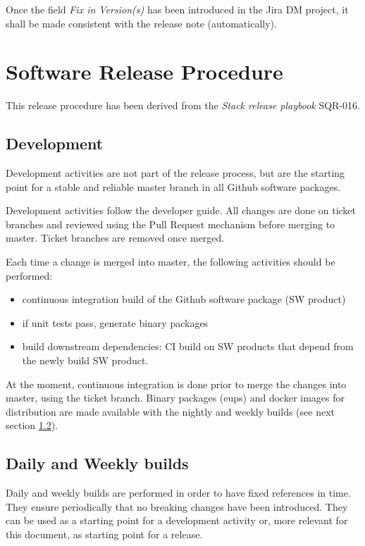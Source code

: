 Once the field \textit{Fix in Version(s)} has been introduced in the Jira DM project, it shall be made consistent with the release note (automatically).


\newpage
\section{Software Release Procedure} \label{sect:releaseprocedure}

This release procedure has been derived from the \textit{Stack release playbook} SQR-016.

\subsection{Development} \label{sect:dev}

Development activities are not part of the release process, but are the starting point for a stable and reliable master branch in all Github software packages.

Development activities follow the \citep{DevGuide} developer guide. All changes are done on ticket branches and reviewed using the Pull Request mechanism before merging to master.
Ticket branches are removed once merged.

Each time a change is merged into master, the following activities should be performed:

\begin{itemize}
\item continuous integration build of the Github software package (SW product)
\item if unit tests pass, generate binary packages
\item build downstream dependencies: CI build on SW products that depend from the newly build SW product.
\end{itemize}

At the moment, continuous integration is done prior to merge the changes into master, using the ticket branch. Binary packages (eups) and docker images for distribution are made available with the nightly and weekly builds (see next section \ref{sect:weekly}).


\subsection{Daily and Weekly builds} \label{sect:weekly}

Daily and weekly builds are performed in order to have fixed references in time.
They ensure periodically that no breaking changes have been introduced. 
They can be used as a starting point for a development activity or, more relevant for this document, as starting point for a release.

